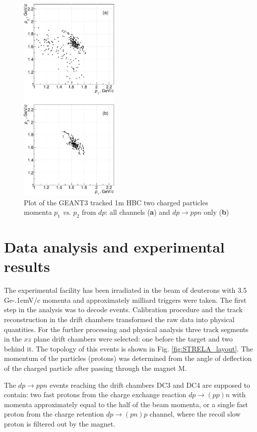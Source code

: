 \documentclass[twocolumn,epjc3]{svjour3}
\newcommand{\dpfrag} {\ensuremath{dp \rightarrow ppn}\xspace}
\newcommand{\dpchex} {\ensuremath{dp \rightarrow (pp)n}\xspace}
\newcommand{\dpret}  {\ensuremath{dp \rightarrow (pn)p}\xspace}
\newcommand{\GeVc}   {Ge\kern-.1emV/c\xspace}
\begin{document}
\begin{figure}[t]
  \centering
  \includegraphics[width=0.43\textwidth]{p1_vs_p2_1.pdf}
  \caption{Plot of the GEANT3 tracked 1m HBC two charged particles momenta $p_1$
    \textit{vs.} $p_2$ from $dp$: all channels (\textbf{a}) and \dpfrag only
    (\textbf{b})}
  \label{fig:p1vsp2_sim}
\end{figure}

\section{Data analysis and experimental results}
The experimental facility has been irradiated in the beam of deuterons with 3.5
\GeVc momenta and approximately milliard triggers were taken. The first step in
the analysis was to decode events. Calibration procedure and the track
reconstruction in the drift chambers transformed the raw data into physical
quantities. For the further processing and physical analysis three track
segments in the $xz$ plane drift chambers were selected: one before the target
and two behind it. The topology of this events is shown in
Fig. \ref{fig:STRELA_layout}. The momentum of the particles (protons) was
determined from the angle of deflection of the charged particle after passing
through the magnet M.

The \dpfrag events reaching the drift chambers DC3 and DC4 are supposed to
contain: two fast protons from the charge exchange reaction \dpchex with momenta
approximately equal to the half of the beam momenta, or a single fast proton
from the charge retention \dpret channel, where the recoil slow proton is
filtered out by the magnet.
\end{document}
